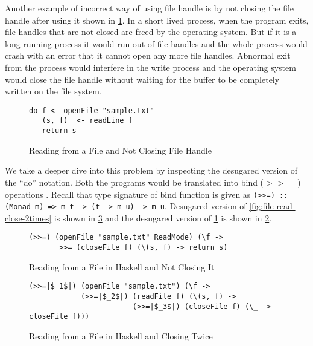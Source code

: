 Another example of incorrect way of using file handle is by not closing the file handle after using it shown in \cref{fig:file-read-noclose}.
In a short lived process, when the program exits, file handles that are not closed are freed by the operating system.
But if it is a long running process it would run out of file handles and the whole process would crash with an error that
it cannot open any more file handles. Abnormal exit from the process would interfere in the write process
and the operating system would close the file handle without waiting for the buffer to be completely
written on the file system.
\begin{figure}[h]
  \begin{framed}
    \begin{verbatim}
do f <- openFile "sample.txt"
   (s, f)  <- readLine f
   return s
    \end{verbatim}
  \end{framed}
  \caption{Reading from a File and Not Closing File Handle}
  \label{fig:file-read-noclose}
\end{figure}

We take a deeper dive into this problem by inspecting the desugared version of the ``do'' notation.
Both the programs would be translated into bind ($>>=$) operations . Recall that type signature of bind function is given as
\texttt{(>>=) :: (Monad m) => m t -> (t -> m u) -> m u}. Desugared version of \cref{fig:file-read-close-2times}
is shown in \cref{fig:file-read-close-2times-desugared} and the desugared version of \cref{fig:file-read-noclose} is shown in \cref{fig:file-read-noclose-desugared}.

\begin{figure}[h]
\begin{framed}
\begin{verbatim}
(>>=) (openFile "sample.txt" ReadMode) (\f ->
       >>= (closeFile f) (\(s, f) -> return s)
\end{verbatim}
  \end{framed}
  \caption{Reading from a File in Haskell and Not Closing It}
  \label{fig:file-read-noclose-desugared}
\end{figure}

\begin{figure}[h]
  \begin{framed}
    \begin{verbatim}
(>>=|$_1$|) (openFile "sample.txt") (\f ->
            (>>=|$_2$|) (readFile f) (\(s, f) ->
                        (>>=|$_3$|) (closeFile f) (\_ -> closeFile f)))
    \end{verbatim}
  \end{framed}
  \caption{Reading from a File in Haskell and Closing Twice}
  \label{fig:file-read-close-2times-desugared}
\end{figure}

